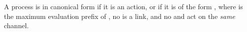 \begin{definition}\label{def:cp-canonical-forms}
  A process  is in canonical form if it is an action, or if it is of the
  form , where  is the maximum evaluation
  prefix of , no  is a link, and no  and  act on
  the \emph{same} channel.
\end{definition}
